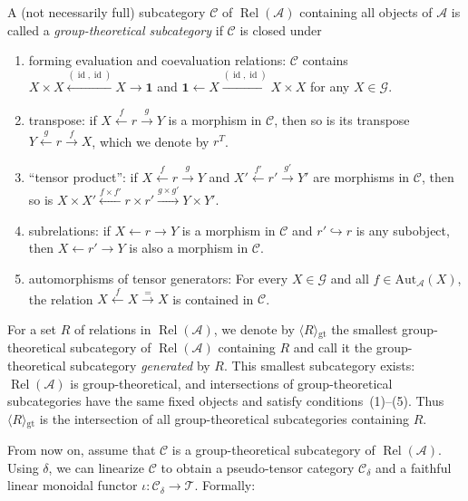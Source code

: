 \documentclass[11pt]{amsart}
\theoremstyle{definition}
\theoremstyle{remark}
\newcommand\cA{\mathcal A}
\newcommand\cC{\mathcal C}
\newcommand\cT{\mathcal T}
\newcommand\id{\operatorname{id}}
\renewcommand\:\colon
\newcommand\one{\mathbf{1}}
\newcommand\cG{\mathcal G}
\renewcommand\:\colon
\newcommand\Rel{\operatorname{Rel}}
\newcommand\angl[1]{\langle{}#1\rangle{}} %
\newcommand\gtcategory[1]{\angl{#1}_{\mathrm{gt}}}
\begin{document}
\begin{definition} \label{d:group-theoretical}
    A (not necessarily full) subcategory $\cC$ of $\Rel(\cA)$ containing all objects of $\cA$
    is called a \emph{group-theoretical subcategory} if $\cC$ is closed under

    \begin{enumerate}[label=(\arabic*)]
        \item forming evaluation and coevaluation relations: $\cC$ contains $X\times X \xleftarrow{(\id,\id)} X \xrightarrow{} \one$ and $\one \xleftarrow{} X \xrightarrow{(\id,\id)} X\times X$ for any $X \in \cG$.
        \item transpose: if $X \xleftarrow{f} r \xrightarrow{g} Y$ is a morphism in $\cC$, then so is its transpose $Y \xleftarrow{g} r \xrightarrow{f} X$, which we denote by $r^T$.
        \item ``tensor product'': if $X \xleftarrow{f} r \xrightarrow{g} Y$ and
            $X' \xleftarrow{f'} r' \xrightarrow{g'} Y'$ are morphisms in
            $\cC$, then so is $X \times X' \xleftarrow{f \times f'} r
            \times r' \xrightarrow{g \times g'} Y \times Y'$.
        \item subrelations: if $X \leftarrow r \to Y$ is a
            morphism in $\cC$ and $r' \hookrightarrow r$ is any subobject,
            then $X \leftarrow r' \rightarrow Y$ is also a morphism in
            $\cC$.
        \item automorphisms of tensor generators: For every $X \in \cG$ and all
            $f \in \mathrm{Aut}_{\cA}(X)$, the relation $X \xleftarrow{f} X \xrightarrow{=} X$ is contained in $\cC$.
    \end{enumerate}

    For a set $R$ of relations in $\Rel(\cA)$, we denote by $\gtcategory{R}$ the smallest group-theoretical subcategory of $\Rel(\cA)$ containing $R$ and call it the group-theoretical subcategory \emph{generated} by $R$. This smallest subcategory exists: $\Rel(\cA)$ is group-theoretical, and intersections of group-theoretical subcategories have the same fixed objects and satisfy conditions~(1)--(5). Thus $\gtcategory{R}$ is the intersection of all group-theoretical subcategories containing $R$.
\end{definition}

From now on, assume that $\cC$ is a group-theoretical subcategory
of $\Rel(\cA)$.
Using $\delta$, we can linearize $\cC$ to obtain a pseudo-tensor
category $\cC_\delta$ and a faithful linear monoidal
functor $\iota: \cC_\delta \to \cT$. Formally:
\end{document}
